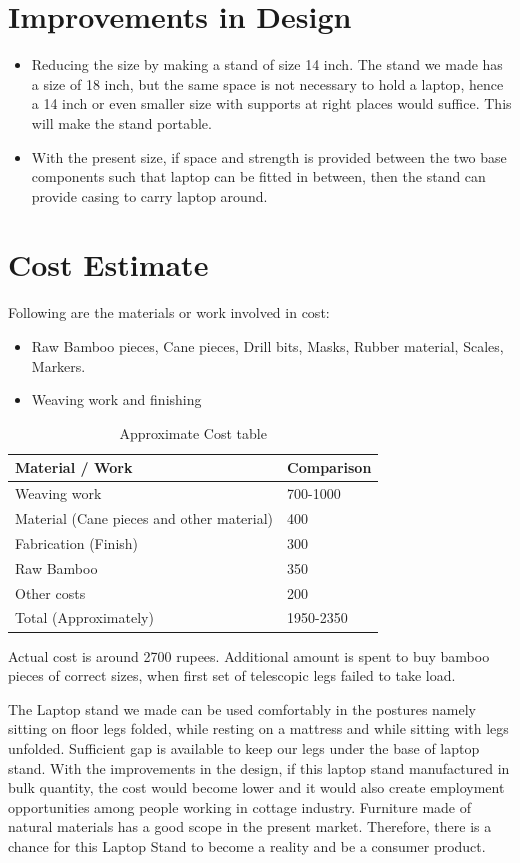 \section{Improvements in Design}

\begin{itemize}
\item Reducing the size by making a stand of size 14 inch. The stand we made has a size of 18 inch, but the same space is not necessary to hold a laptop, hence a 14 inch or even smaller size with supports at right places would suffice. This will make the stand portable.
\item With the present size, if space and strength is provided between the two base components such that laptop can be fitted in between, then the stand can provide casing to carry laptop around.

\end{itemize}

\section{Cost Estimate}

Following are the materials or work involved in cost:
\begin{itemize}
\item Raw Bamboo pieces, Cane pieces, Drill bits, Masks, Rubber material, Scales, Markers.
\item Weaving work and finishing
\end{itemize}

\begin{table}[h!]
  \centering
  \caption{Approximate Cost table}
  \label{tab:table6}
  \begin{tabular}{l||l}
  	\hline
  	Material / Work & Comparison\\
    \hline    
	
Weaving work&
700-1000\\
Material (Cane pieces and other material)&
400\\
Fabrication (Finish)&
300\\
Raw Bamboo&
350\\
Other costs&
200\\
Total (Approximately)&
1950-2350\\

  \end{tabular}
\end{table}

Actual cost is around 2700 rupees. Additional amount is spent to buy bamboo pieces of correct sizes, when first set of telescopic legs failed to take load.


The Laptop stand we made can be used comfortably in the postures namely sitting on floor legs folded, while resting on a mattress and while sitting with legs unfolded. Sufficient gap is available to keep our legs under the base of laptop stand. With the improvements in the design, if this laptop stand manufactured in bulk quantity, the cost would become lower and it would also create employment opportunities among people working in cottage industry. Furniture made of natural materials has a good scope in the present market. Therefore, there is a chance for this Laptop Stand to become a reality and be a consumer product. 
